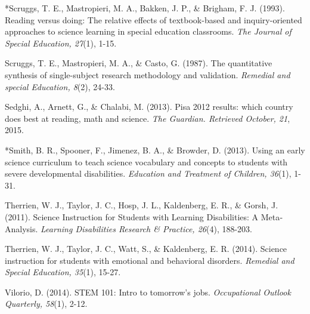 \documentclass[11.5pt]{sig-alternate} %
\begin{document}
*Scruggs, T. E., Mastropieri, M. A., Bakken, J. P., \& Brigham, F. J. (1993). Reading versus doing: The relative effects of textbook-based and inquiry-oriented approaches to science learning in special education classrooms. \textit{The Journal of Special Education, 27}(1), 1-15.

Scruggs, T. E., Mastropieri, M. A., \& Casto, G. (1987).  The quantitative synthesis of single-subject research methodology and validation. \textit{Remedial and special Education, 8}(2), 24-33.

Sedghi, A., Arnett, G., \& Chalabi, M. (2013). Pisa 2012 results: which country does best at reading, math and science. \textit{The Guardian. Retrieved October, 21}, 2015.

*Smith, B. R., Spooner, F., Jimenez, B. A., \& Browder, D. (2013). Using an early science curriculum to teach science vocabulary and concepts to students with severe developmental disabilities. \textit{Education and Treatment of Children, 36}(1), 1-31.

Therrien, W. J., Taylor, J. C., Hosp, J. L., Kaldenberg, E. R., \& Gorsh, J. (2011). Science Instruction for Students with Learning Disabilities: A Meta‐Analysis. \textit{Learning Disabilities Research \& Practice, 26}(4), 188-203.

Therrien, W. J., Taylor, J. C., Watt, S., \& Kaldenberg, E. R. (2014). Science instruction for students with emotional and behavioral disorders. \textit{Remedial and Special Education, 35}(1), 15-27.

Vilorio, D. (2014). STEM 101: Intro to tomorrow’s jobs. \textit{Occupational Outlook Quarterly, 58}(1), 2-12.
\end{document}

